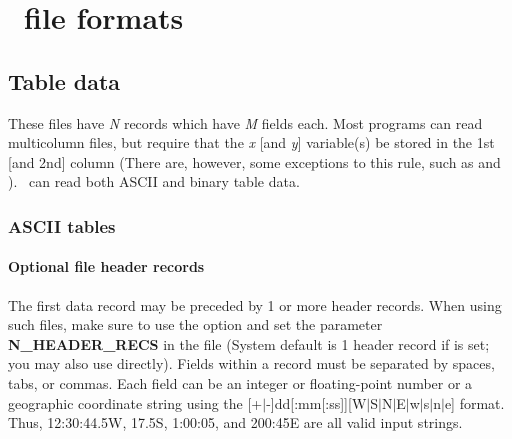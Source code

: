 %
%

\chapter{\gmt\ file formats}
\label{app:B}
\thispagestyle{headings}

\section{Table data} 

These files have {\it N} records which have {\it M} fields each.
Most programs can read multicolumn files, but require that the
{\it x} [and {\it y}] variable(s) be stored in the 1st [and 2nd]
column (There are, however, some exceptions to this rule, such as
 and ).  \GMT\ can read both ASCII and
binary table data.

\subsection{ASCII tables}
\subsubsection{Optional file header records}
The first data record may be preceded by 1 or more header records.
When using such files, make sure to use the  option and set
the parameter {\bf N\_HEADER\_RECS} in the  file
(System default is 1 header record if  is set; you may also
use  directly).  Fields
within a record must be separated by spaces, tabs, or commas.
Each field can be an integer or floating-point number or a geographic
coordinate string using the [+$|$-]dd[:mm[:ss]][W$|$S$|$N$|$E$|$w$|$s$|$n$|$e] format.
Thus, 12:30:44.5W, 17.5S, 1:00:05, and 200:45E are all valid input strings.
